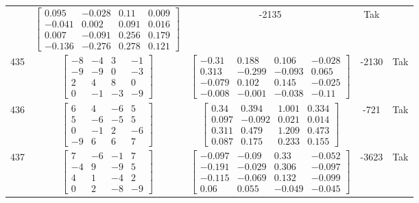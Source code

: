 \documentclass[a4paper,12pt]{article}
\begin{document}
\begin{tabular}{c c c c c}
&
$\begin{bmatrix} 0.095 & -0.028 & 0.11 & 0.009 \\ -0.041 & 0.002 & 0.091 & 0.016 \\ 0.007 & -0.091 & 0.256 & 0.179 \\ -0.136 & -0.276 & 0.278 & 0.121 \end{bmatrix}$
&
-2135
&
Tak
\\
435
&
$\begin{bmatrix} -8 & -4 & 3 & -1 \\ -9 & -9 & 0 & -3 \\ 2 & 4 & 8 & 0 \\ 0 & -1 & -3 & -9 \end{bmatrix}$
&
$\begin{bmatrix} -0.31 & 0.188 & 0.106 & -0.028 \\ 0.313 & -0.299 & -0.093 & 0.065 \\ -0.079 & 0.102 & 0.145 & -0.025 \\ -0.008 & -0.001 & -0.038 & -0.11 \end{bmatrix}$
&
-2130
&
Tak
\\
436
&
$\begin{bmatrix} 6 & 4 & -6 & 5 \\ 5 & -6 & -5 & 5 \\ 0 & -1 & 2 & -6 \\ -9 & 6 & 6 & 7 \end{bmatrix}$
&
$\begin{bmatrix} 0.34 & 0.394 & 1.001 & 0.334 \\ 0.097 & -0.092 & 0.021 & 0.014 \\ 0.311 & 0.479 & 1.209 & 0.473 \\ 0.087 & 0.175 & 0.233 & 0.155 \end{bmatrix}$
&
-721
&
Tak
\\
437
&
$\begin{bmatrix} 7 & -6 & -1 & 7 \\ -4 & 9 & -9 & 5 \\ 4 & 1 & -4 & 2 \\ 0 & 2 & -8 & -9 \end{bmatrix}$
&
$\begin{bmatrix} -0.097 & -0.09 & 0.33 & -0.052 \\ -0.191 & -0.029 & 0.306 & -0.097 \\ -0.115 & -0.069 & 0.132 & -0.099 \\ 0.06 & 0.055 & -0.049 & -0.045 \end{bmatrix}$
&
-3623
&
Tak
\\

\end{tabular}
\end{document}
